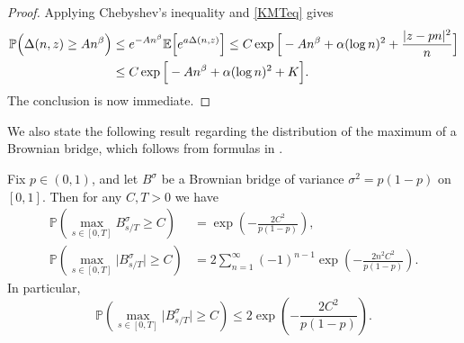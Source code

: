 \begin{proof}
	Applying Chebyshev's inequality and \eqref{KMTeq} gives
	\begin{align*}
	\mathbb{P}\Big(\Delta(n,z) \geq An^\beta\Big) &\leq e^{-An^\beta}\mathbb{E}\Big[e^{a\Delta(n,z)}\Big] \leq C\exp\Big[-An^\beta + \alpha(\log n)^2 + \frac{|z-pn|^2}{n}\Big]\\
	&\leq C\exp\Big[-An^\beta + \alpha(\log n)^2 + K\Big].
	\end{align*}
	The conclusion is now immediate.
\end{proof}

We also state the following result regarding the distribution of the maximum of a Brownian bridge, which follows from formulas in \cite[Section 12.3]{Dudley}.

\begin{lemma}\label{BBmax}
	Fix $p\in (0,1)$, and let $B^\sigma$ be a Brownian bridge of variance $\sigma^2 = p(1-p)$ on $[0,1]$. Then for any $C,T> 0$ we have
	\begin{equation}\label{BBmaxeq}
	\begin{split}
	\mathbb{P}\left(\max_{s\in[0,T]} B^\sigma_{s/T} \geq C\right) &= \exp\left( - \frac{2C^2}{p(1-p)}\right), \\ \mathbb{P}\left(\max_{s\in[0,T]} \big| B^\sigma_{s/T} \big| \geq C\right) &= 2\sum_{n=1}^\infty (-1)^{n-1} \exp\left(-\frac{2n^2C^2}{p(1-p)}\right).
	\end{split}
	\end{equation}
	In particular,
	\begin{equation}\label{sepBd}
	\mathbb{P}\left(\max_{s\in[0,T]} \big|B^\sigma_{s/T}\big| \geq C\right) \leq 2\exp\left( - \frac{2C^2}{p(1-p)}\right).
	\end{equation}
\end{lemma}

